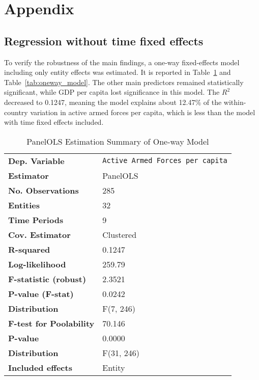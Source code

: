 \chapter*{Appendix}

\section*{Regression without time fixed effects}

To verify the robustness of the main findings, a one-way fixed-effects model including 
only entity effects was estimated. It is reported in Table~\ref{tab:oneway_summary} and
Table~\ref{tab:oneway_model}.
The other main predictors remained statistically 
significant, while GDP per capita lost significance in this model. 
The $R^2$ decreased to 0.1247, 
meaning the model explains about 12.47\% of the within-country variation in 
active armed forces per capita, which is less than the model with time fixed effects included.

\renewcommand{\arraystretch}{1.3}

\begin{table}[htbp]
\caption{PanelOLS Estimation Summary of One-way Model}
\centering
\begin{threeparttable}
\begin{tabularx}{\textwidth}{@{}lX@{}}
\toprule
\textbf{Dep. Variable} & \texttt{Active Armed Forces per capita} \\
\textbf{Estimator} & PanelOLS \\
\textbf{No. Observations} & 285 \\
\textbf{Entities} & 32 \\
\textbf{Time Periods} & 9 \\
\textbf{Cov. Estimator} & Clustered \\
\midrule
\textbf{R-squared} & 0.1247 \\
\textbf{Log-likelihood} & 259.79 \\
\textbf{F-statistic (robust)} & 2.3521 \\
\textbf{P-value (F-stat)} & 0.0242 \\
\textbf{Distribution} & F(7, 246) \\
\midrule
\textbf{F-test for Poolability} & 70.146 \\
\textbf{P-value} & 0.0000 \\
\textbf{Distribution} & F(31, 246) \\
\textbf{Included effects} & Entity \\
\bottomrule
\end{tabularx}
\end{threeparttable}
\label{tab:oneway_summary}
\end{table}

